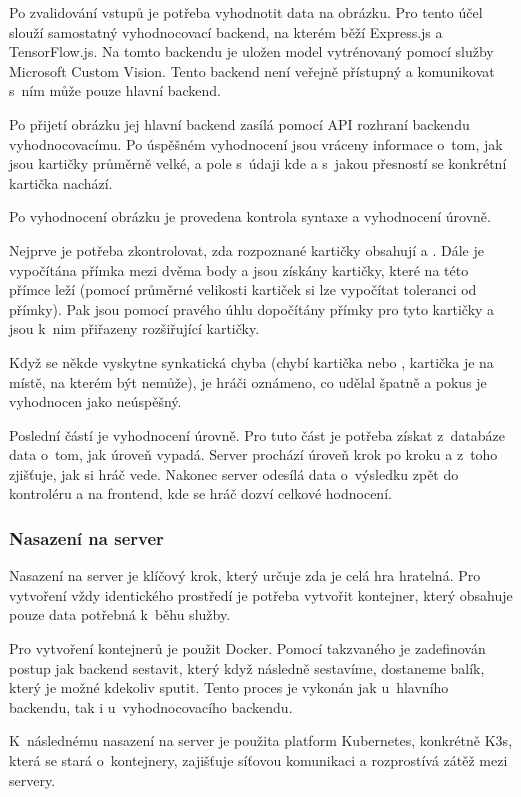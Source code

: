 Po zvalidování vstupů je potřeba vyhodnotit data na obrázku. Pro tento účel slouží samostatný vyhodnocovací backend, na kterém běží Express.js a TensorFlow.js. Na tomto backendu je uložen model vytrénovaný pomocí služby Microsoft Custom Vision. Tento backend není veřejně přístupný a komunikovat s~ním může pouze hlavní backend.\par
Po přijetí obrázku jej hlavní backend zasílá pomocí API rozhraní backendu vyhodnocovacímu. Po úspěšném vyhodnocení jsou vráceny informace o~tom, jak jsou kartičky průměrně velké, a pole s~údaji kde a s~jakou přesností se konkrétní kartička nachází.

Po vyhodnocení obrázku je provedena kontrola syntaxe a vyhodnocení úrovně.\par
Nejprve je potřeba zkontrolovat, zda rozpoznané kartičky obsahují  a . Dále je vypočítána přímka mezi dvěma body a jsou získány kartičky, které na této přímce leží (pomocí průměrné velikosti kartiček si lze vypočítat toleranci od přímky). Pak jsou pomocí pravého úhlu dopočítány přímky pro tyto kartičky a jsou k~nim přiřazeny rozšiřující kartičky.\par
Když se někde vyskytne synkatická chyba (chybí kartička  nebo , kartička je na místě, na kterém být nemůže), je hráči oznámeno, co udělal špatně a pokus je vyhodnocen jako neúspěšný.\par
Poslední částí je vyhodnocení úrovně. Pro tuto část je potřeba získat z~databáze data o~tom, jak úroveň vypadá. Server prochází úroveň krok po kroku a z~toho zjišťuje, jak si hráč vede. Nakonec server odesílá data o~výsledku zpět do kontroléru a na frontend, kde se hráč dozví celkové hodnocení.

\subsubsection{Nasazení na server}
Nasazení na server je klíčový krok, který určuje zda je celá hra hratelná.
Pro vytvoření vždy identického prostředí je potřeba vytvořit kontejner, který obsahuje pouze data potřebná k~běhu služby.\par
Pro vytvoření kontejnerů je použit Docker. Pomocí takzvaného  je zadefinován postup jak backend sestavit, který když následně sestavíme, dostaneme balík, který je možné kdekoliv sputit. Tento proces je vykonán jak u~hlavního backendu, tak i u~vyhodnocovacího backendu.\par
K~následnému nasazení na server je použita platform Kubernetes, konkrétně K3s, která se stará o~kontejnery, zajišťuje síťovou komunikaci a rozprostívá zátěž mezi servery.
